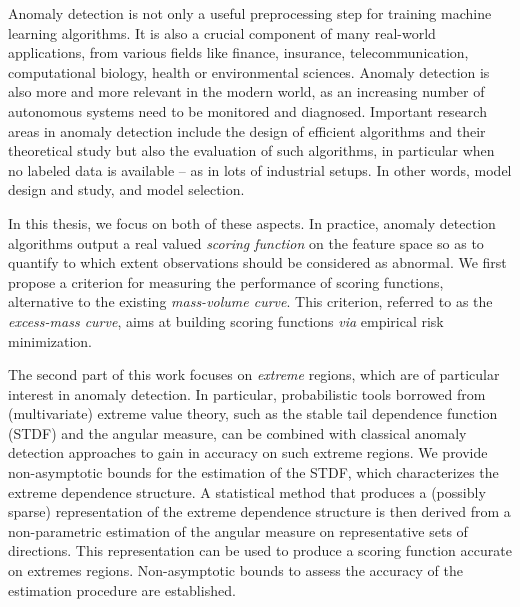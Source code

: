 \documentclass[a4paper, 8pt]{article}
\begin{document}
Anomaly detection is not only a useful preprocessing step for training machine learning algorithms. It is also a crucial component of many real-world applications, from various fields like finance, insurance, telecommunication, computational biology, health or environmental sciences. Anomaly detection is also more and more relevant in the modern world, as an increasing number of autonomous systems need to be monitored and diagnosed. %
%
Important research areas in anomaly detection include the design of efficient algorithms and their theoretical study %
but also the evaluation of such algorithms, in particular when no labeled data is available -- as in lots of industrial setups. 
In other words, model design and study, and model selection.

In this thesis, we focus on both of these aspects. 
In practice, anomaly detection algorithms output a real valued \emph{scoring function} on the feature space so as to quantify to which extent observations should be considered as abnormal.
%
We first propose a criterion for measuring the performance of scoring functions, alternative to the existing \emph{mass-volume curve}. %
This criterion, referred to as the \emph{excess-mass curve}, aims at building scoring functions \emph{via} empirical risk minimization.

The second part of this work focuses on \emph{extreme} regions, which are of particular interest in anomaly detection. In particular, probabilistic tools borrowed from (multivariate) extreme value theory, such as the stable tail dependence function (STDF) and the angular measure, can be combined with classical anomaly detection approaches to gain in accuracy on such extreme regions.
%
We provide non-asymptotic bounds for the estimation of the STDF, which characterizes the extreme dependence structure.
%
A statistical method that produces a (possibly sparse) representation of the extreme dependence structure is then derived from a non-parametric estimation of the angular measure on representative sets of directions. This representation can be used to produce a scoring function accurate on extremes regions. Non-asymptotic bounds to assess the accuracy of the estimation procedure are established.
\end{document}
